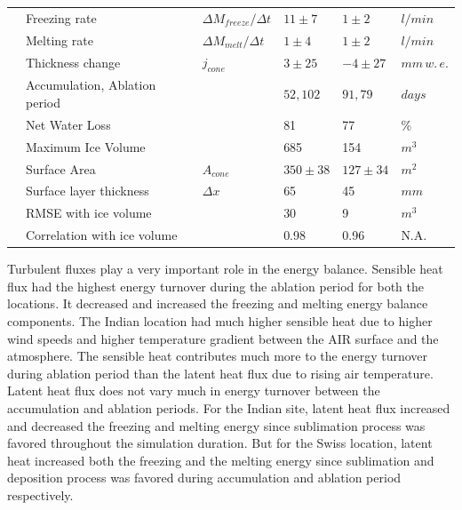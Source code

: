 \documentclass[utf8]{frontiersSCNS}
\begin{document}
\begin{table}
\begin{tabular}{@{}|llllll|@{}}
		                       & Freezing rate                   & ${\Delta M_{freeze}}/{\Delta t}$    & $11 \pm 7$    & $1 \pm 2$     & $l/min$ \\
		\multicolumn{1}{|l|}{} & Melting rate                    & ${\Delta M_{melt}}/{\Delta t}$      & $1 \pm 4$     & $1 \pm 2$     & $l/min$ \\
		\multicolumn{1}{|l|}{} & Thickness change                & $j_{cone}$      & $3 \pm 25$    & $-4 \pm 27$   &
		$mm \, w.\,e.$                                                                                                       \\
		\multicolumn{1}{|l|}{} & Accumulation, Ablation period   &                 & $52, 102$     & $91,79$       & $days$  \\
		\multicolumn{1}{|l|}{} & Net Water Loss                  &                 & 81            & 77
		                       & \%                                                                                          \\
		\multicolumn{1}{|l|}{} & Maximum Ice Volume              &                 & 685           & 154           & $m^{3}$ \\
		\multicolumn{1}{|l|}{} & Surface Area                    & $A_{cone}$      & $350 \pm 38$  & $127 \pm 34$  & $m^{2}$ \\\midrule
		\multicolumn{1}{|l|}{\multirow{3}{*}{\rotatebox[origin=c]{90}{Model}}}
		                       & Surface layer thickness & $\Delta x$ & 65          & 45            &                $mm$  \\
		\multicolumn{1}{|l|}{} & RMSE with ice volume        &                 & 30            & 9            & $m^{3}$ \\
		\multicolumn{1}{|l|}{} & Correlation with ice volume &                 & 0.98          & 0.96          &
		N.A.                                                                                                                 \\\bottomrule
	\end{tabular}
\end{table}

Turbulent fluxes play a very important role in the energy balance. Sensible heat flux had the highest energy
turnover during the ablation period for both the locations. It decreased and increased the freezing and melting
energy balance components. The Indian location had much higher sensible heat due to higher wind speeds and
higher temperature gradient between the AIR surface and the atmosphere. The sensible heat contributes much more
to the energy turnover during ablation period than the latent heat flux due to rising air temperature. Latent
heat flux does not vary much in energy turnover between the accumulation and ablation periods. For the Indian
site, latent heat flux increased and decreased the freezing and melting energy since sublimation process was
favored throughout the simulation duration. But for the Swiss location, latent heat increased both the freezing
and the melting energy since sublimation and deposition process was favored during accumulation and ablation
period respectively.
\end{document}
